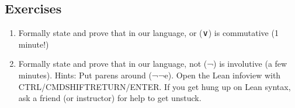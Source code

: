 \documentclass[letterpaper,10pt,english]{sphinxmanual}
\begin{document}
\begin{sphinxVerbatim}[commandchars=\\\{\}]
     
     
     
       

    
\end{sphinxVerbatim}


\subsection{Exercises}
\label{\detokenize{A_01_Propositional_Logic:exercises}}\begin{enumerate}
%
\item {} 
\sphinxAtStartPar
Formally state and prove that in our language, or (∨) is commutative (1 minute!)

\item {} 
\sphinxAtStartPar
Formally state and prove that in our language, not (¬) is involutive (a few minutes).
Hints: Put parens around (¬¬e). Open the Lean infoview with CTRL/CMD\sphinxhyphen{}SHIFT\sphinxhyphen{}RETURN/ENTER.
If you get hung up on Lean syntax, ask a friend (or instructor) for help to get unstuck.

\end{enumerate}
\end{document}

